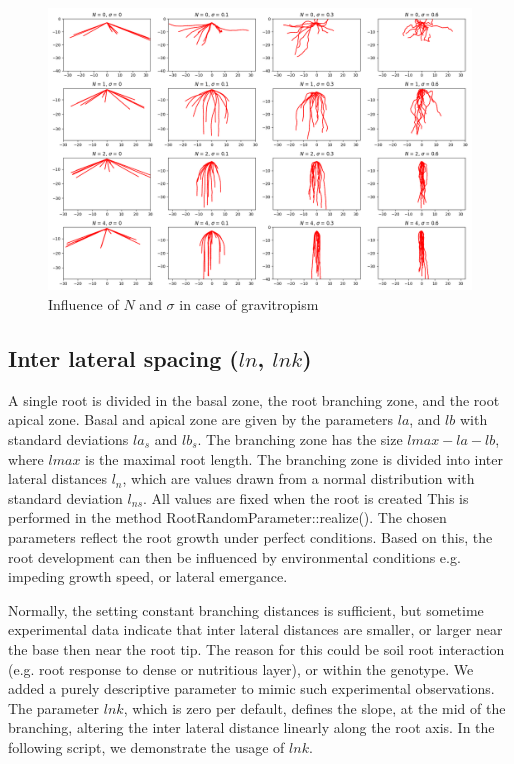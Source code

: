 \begin{figure}
\centering
\includegraphics[width=\textwidth]{fig_gravitropism.png}
\caption{Influence of $N$ and $\sigma$ in case of gravitropism} \label{fig:tropism}
\end{figure}




\subsection{Inter lateral spacing ($ln$, $lnk$)} \label{ssec:spacing}

A single root is divided in the basal zone, the root branching zone, and the root apical zone. Basal and apical zone are given by the parameters $la$, and $lb$ with standard deviations $la_s$ and $lb_s$. The branching zone has the size $lmax-la-lb$, where $lmax$ is the maximal root length. The branching zone is divided into inter lateral distances $l_n$, which are values drawn from a normal distribution with standard deviation $l_{ns}$. All values are fixed when the root is created This is performed in the method RootRandomParameter::realize(). The chosen parameters reflect the root growth under perfect conditions. Based on this, the root development can then be influenced by environmental conditions e.g. impeding growth speed, or lateral emergance.

Normally, the setting constant branching distances is sufficient, but sometime experimental data indicate that inter lateral distances are smaller, or larger near the base then near the root tip. The reason for this could be soil root interaction (e.g. root response to dense or nutritious layer), or within the genotype. We added a purely descriptive parameter to mimic such experimental observations. The parameter $lnk$, which is zero per default, defines the slope, at the mid of the branching, altering the inter lateral distance linearly along the root axis. In the following script, we demonstrate the usage of $lnk$.

